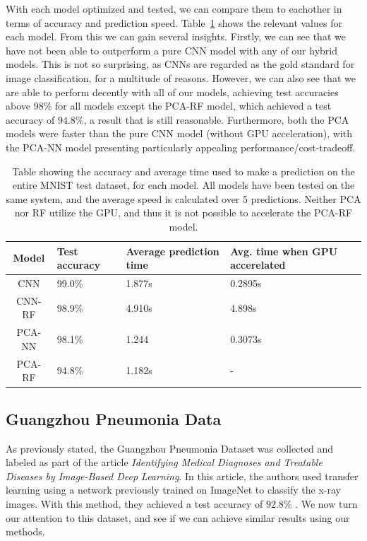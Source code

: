\documentclass[onecolumn,10pt,cleanfoot]{asme2ej}
\begin{document}
With each model optimized and tested, we can compare them to eachother in terms of accuracy and prediction speed. Table~\ref{modcompmnist} shows the relevant values for each model. From this we can gain several insights. Firstly, we can see that we have not been able to outperform a pure CNN model with any of our hybrid models. This is not so surprising, as CNNs are regarded as the gold standard for image classification, for a multitude of reasons. However, we can also see that we are able to perform decently with all of our models, achieving test accuracies above $98\%$ for all models except the PCA-RF model, which achieved a test accuracy of $94.8\%$, a result that is still reasonable. Furthermore, both the PCA models were faster than the pure CNN model (without GPU acceleration), with the PCA-NN model presenting particularly appealing performance/cost-tradeoff.

\begin{table}[H]
\caption{Table showing the accuracy and average time used to make a prediction on the entire MNIST test dataset, for each model. All models have been tested on the same system, and the average speed is calculated over 5 predictions. Neither PCA nor RF utilize the GPU, and thus it is not possible to accelerate the PCA-RF model.}
\begin{center}
\label{modcompmnist}
\begin{tabular}{| c | l | l | l |}
\hline
Model & Test accuracy & Average prediction time & Avg. time when GPU accerelated \\
\hline
CNN & 99.0\% & 1.877s & 0.2895s \\
CNN-RF & 98.9\% & 4.910s & 4.898s \\
PCA-NN & 98.1\% & 1.244 & 0.3073s \\
PCA-RF & 94.8\% & 1.182s & - \\
\hline
\end{tabular}
\end{center}
\end{table}

\subsection{Guangzhou Pneumonia Data}

As previously stated, the Guangzhou Pneumonia Dataset was collected and labeled as part of the article {\it Identifying Medical Diagnoses and Treatable Diseases by Image-Based Deep Learning}. In this article, the authors used transfer learning using a network previously trained on ImageNet to classify the x-ray images. With this method, they achieved a test accuracy of $92.8\%$ \cite[1127]{xray}. We now turn our attention to this dataset, and see if we can achieve similar results using our methods.
\end{document}
